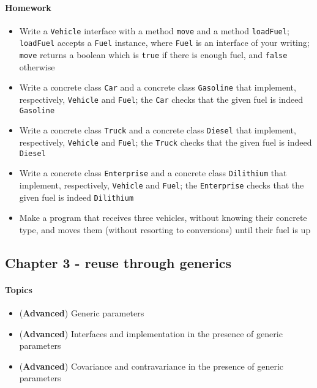 		\paragraph*{Homework}
		\begin{itemize}
			\item Write a \texttt{Vehicle} interface with a method \texttt{move} and a method \texttt{loadFuel}; \texttt{loadFuel} accepts a \texttt{Fuel} instance, where \texttt{Fuel} is an interface of your writing; \texttt{move} returns a boolean which is \texttt{true} if there is enough fuel, and \texttt{false} otherwise
			\item Write a concrete class \texttt{Car} and a concrete class \texttt{Gasoline} that implement, respectively, \texttt{Vehicle} and \texttt{Fuel}; the \texttt{Car} checks that the given fuel is indeed \texttt{Gasoline}
			\item Write a concrete class \texttt{Truck} and a concrete class \texttt{Diesel} that implement, respectively, \texttt{Vehicle} and \texttt{Fuel}; the \texttt{Truck} checks that the given fuel is indeed \texttt{Diesel}
			\item Write a concrete class \texttt{Enterprise} and a concrete class \texttt{Dilithium} that implement, respectively, \texttt{Vehicle} and \texttt{Fuel}; the \texttt{Enterprise} checks that the given fuel is indeed \texttt{Dilithium}
			\item Make a program that receives three vehicles, without knowing their concrete type, and moves them (without resorting to conversions) until their fuel is up
		\end{itemize}
		
		\subsection{Chapter 3 - reuse through generics}
		\paragraph*{Topics}			
		\begin{itemize}
			\item (\textbf{Advanced}) Generic parameters
			\item (\textbf{Advanced}) Interfaces and implementation in the presence of generic parameters
			\item (\textbf{Advanced}) Covariance and contravariance in the presence of generic parameters
		\end{itemize}
		
